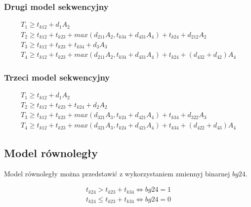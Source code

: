 \subsubsection{Drugi model sekwencyjny}

\begin{equation} \label{eq:sek2}
\begin{array}{l}
T_{1} \geq t_{k12} + d_{1}A_{2} \\
T_{2} \geq t_{k12} + t_{k23} + max(d_{211}A_{2}, t_{k34} + d_{431}A_{4}) + t_{k24} + d_{212}A_{2} \\
T_{3} \geq t_{k12} + t_{k23} + t_{k34} + d_{3}A_{3} \\
T_{4} \geq t_{k12} + t_{k23} + max(d_{211}A_{2}, t_{k34} + d_{431}A_{4}) + t_{k24} + (d_{432} + d_{42})A_{4}
\end{array} 
\end{equation}

\subsubsection{Trzeci model sekwencyjny}

\begin{equation} \label{eq:sek3}
\begin{array}{l}
T_{1} \geq t_{k12} + d_{1}A_{2} \\
T_{2} \geq t_{k12} + t_{k23} + t_{k24} + d_{2}A_{2} \\
T_{3} \geq t_{k12} + t_{k23} + max(d_{321}A_{3}, t_{k24} + d_{421}A_{4}) + t_{k34} + d_{322}A_{3} \\
T_{4} \geq t_{k12} + t_{k23} + max(d_{321}A_{3}, t_{k24} + d_{421}A_{4}) + t_{k34} + (d_{422} + d_{43})A_{4}
\end{array}
\end{equation}

\subsection{Model równoległy}

Model równoległy można przedstawić z wykorzystaniem zmiennyj binarnej $bg24$.

\begin{equation} \label{eq:bg24}
\begin{array}{l}
t_{k24} > t_{k23} + t_{k34} \iff bg24 = 1 \\
t_{k24} \leq t_{k23} + t_{k34} \iff bg24 = 0
\end{array}
\end{equation}

